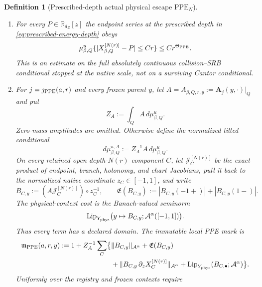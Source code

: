 \documentclass[11pt]{article}
\newtheorem{definition}[theorem]{Definition}
\begin{document}
\begin{definition}[Prescribed-depth actual physical escape
$\mathrm{PPE}_{N}$]
\begin{enumerate}[label=\textup{(PPE\arabic*)}]
\item For every $P\in\mathbb R_{d_Z}[z]$ the endpoint series at the
      \emph{prescribed depth in \eqref{eq:prescribed-energy-depth}} obeys
      \begin{equation}
      \label{eq:ppe-prescribed-sublevel}
       \mu^u_{\beta,Q}
       \{|X^{[N(r)]}_{\beta,Q}-P|\le C r\}
       \le C r^{\Theta_{\rm PPE}} .
      \end{equation}
      This is an estimate on the full absolutely continuous collision--SRB
      conditional stopped at the native scale, not on a surviving Cantor
      conditional.
\item For $j=\jmath_{\rm PPE}(a,r)$ and every frozen parent $y$, let
      $A=A_{\beta,Q,r,y}:=\mathbf A_j(y,\cdot)|_Q$ and put
      \[
       Z_A:=\int_QA\,d\mu^u_{\beta,Q}.
      \]
      Zero-mass amplitudes are omitted.  Otherwise define the normalized
      tilted conditional
      \begin{equation}
      \label{eq:ppe-amplitude-tilt}
       d\mu_{\beta,Q}^{u,A}:=Z_A^{-1}A\,d\mu^u_{\beta,Q}.
      \end{equation}
      On every retained open depth-$N(r)$ component $C$, let
      $\mathcal J_C^{[N(r)]}$ be the exact product of endpoint, branch,
      holonomy, and chart Jacobians, pull it back to the normalized native
      coordinate $z_C\in[-1,1]$, and write
      \[
       B_{C,y}:=(A\mathcal J_C^{[N(r)]})\circ z_C^{-1},
       \qquad
       \mathfrak E(B_{C,y})
       :=|B_{C,y}(-1+)|+|B_{C,y}(1-)|.
      \]
      The physical-context cost is the Banach-valued seminorm
      \[
       \operatorname{Lip}_{Y_{\rm phys}}
       \bigl(y\mapsto B_{C,y};\mathcal A^\alpha([-1,1])\bigr).
      \]
      Thus every term has a declared domain.  The immutable local PPE mark is
      \begin{equation}
      \label{eq:exact-local-ppe-mark}
      \begin{aligned}
       \mathfrak m_{\rm PPE}(a,r,y)
       :=1+Z_A^{-1}\sum_C\bigl\{&
        \|B_{C,y}\|_{\mathcal A^\alpha}
        +\mathfrak E(B_{C,y})\\
        &+\|B_{C,y}\,\partial_zX_C^{[N(r)]}\|_{\mathcal A^\alpha}
        +\operatorname{Lip}_{Y_{\rm phys}}
          (B_{C,\bullet};\mathcal A^\alpha)\bigr\}.
      \end{aligned}
      \end{equation}
      Uniformly over the registry and frozen contexts require
      \begin{equation}
      \label{eq:ppe-weighted-amplitude-sublevel}

\end{equation}
\end{enumerate}
\end{definition}
\end{document}
